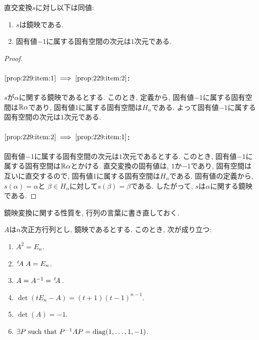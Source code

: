 \begin{prop}
  直交変換$s$に対し以下は同値:
  \begin{enumerate}
  \item
    \label{prop:229:item:1}
    $s$は鏡映である.
  \item
    \label{prop:229:item:2}
    固有値$-1$に属する固有空間の次元は$1$次元である.
  \end{enumerate}
\end{prop}
\begin{proof}
  \paragraph{ $\ref{prop:229:item:1}\implies\ref{prop:229:item:2}$:}
  $s$が$\alpha$に関する鏡映であるとする.
  このとき, 定義から,
  固有値$-1$に属する固有空間は$\mathbb{R}\alpha$であり,
  固有値$1$に属する固有空間は$H_\alpha$である.
  よって固有値$-1$に属する固有空間の次元は$1$次元である.

  \paragraph{ $\ref{prop:229:item:2}\implies\ref{prop:229:item:1}$:}
  固有値$-1$に属する固有空間の次元は$1$次元であるとする.
  このとき, 固有値$-1$に属する固有空間は$\mathbb{R}\alpha$とかける.
  直交変換の固有値は, $1$か$-1$であり, 固有空間は互いに直交するので,
  固有値$1$に属する固有空間は$H_\alpha$である.
  固有値の定義から,
  $s(\alpha)=\alpha$と
  $\beta\in H_\alpha$に対して$s(\beta)=\beta$である.
  したがって,
  $s$は$\alpha$に関する鏡映である.
\end{proof}

鏡映変換に関する性質を, 行列の言葉に書き直しておく.
\begin{cor}
  $A$は$n$次正方行列とし, 鏡映であるとする.
  このとき,
  次が成り立つ:
  \begin{enumerate}
  \item $A^2=E_n$.
  \item $\left.^{t}\!A\right.A=E_n$.
  \item $A=A^{-1}=\left.^{t}\!A\right.$.
  \item $\det(tE_n-A)=(t+1)(t-1)^{n-1}$.
  \item $\det(A)=-1$.
  \item $\exists P \text{ such that } P^{-1}AP=\operatorname{diag}(1,\ldots,1,-1)$.
  \end{enumerate}
\end{cor}




